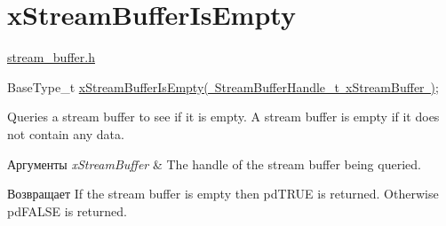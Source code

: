 \hypertarget{group__x_stream_buffer_is_empty}{}\section{x\+Stream\+Buffer\+Is\+Empty}
\label{group__x_stream_buffer_is_empty}
\mbox{\hyperlink{stream__buffer_8h}{stream\+\_\+buffer.\+h}}


\begin{DoxyPre}
BaseType\_t \mbox{\hyperlink{stream__buffer_8h_af65cd558025ddc29ca68fba1b3f5dc19}{xStreamBufferIsEmpty( StreamBufferHandle\_t xStreamBuffer )}};
\end{DoxyPre}


Queries a stream buffer to see if it is empty. A stream buffer is empty if it does not contain any data.


\begin{DoxyParams}{Аргументы}
{\em x\+Stream\+Buffer} & The handle of the stream buffer being queried.\\
\hline
\end{DoxyParams}
\begin{DoxyReturn}{Возвращает}
If the stream buffer is empty then pd\+T\+R\+UE is returned. Otherwise pd\+F\+A\+L\+SE is returned. 
\end{DoxyReturn}
